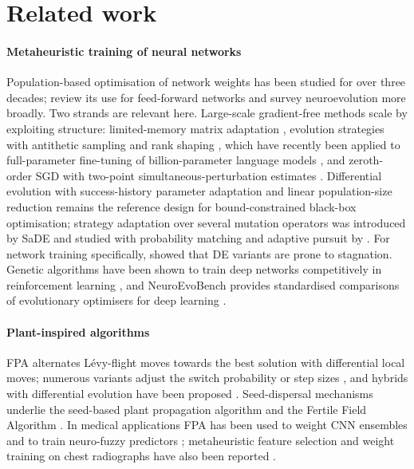 \documentclass[preprint,12pt]{elsarticle}
\begin{document}
\section{Related work}\label{sec:related}

\paragraph{Metaheuristic training of neural networks} Population-based optimisation of network weights has been studied for over three decades; \citet{ojha2017metaheuristic} review its use for feed-forward networks and \citet{stanley2019neuroevolution} survey neuroevolution more broadly. Two strands are relevant here. Large-scale gradient-free methods scale by exploiting structure: limited-memory matrix adaptation \citep{loshchilov2019lmmaes}, evolution strategies with antithetic sampling and rank shaping \citep{salimans2017es}, which have recently been applied to full-parameter fine-tuning of billion-parameter language models \citep{qiu2025esllm}, and zeroth-order SGD with two-point simultaneous-perturbation estimates \citep{spall1992spsa,malladi2023mezo}. Differential evolution \citep{storn1997de} with success-history parameter adaptation \citep{zhang2009jade,tanabe2013shade} and linear population-size reduction \citep{tanabe2014lshade} remains the reference design for bound-constrained black-box optimisation; strategy adaptation over several mutation operators was introduced by SaDE \citep{qin2009sade} and studied with probability matching and adaptive pursuit by \citet{gong2011strategy}. For network training specifically, \citet{piotrowski2014stagnation} showed that DE variants are prone to stagnation. Genetic algorithms have been shown to train deep networks competitively in reinforcement learning \citep{such2017deep}, and NeuroEvoBench provides standardised comparisons of evolutionary optimisers for deep learning \citep{lange2023neuroevobench}.

\paragraph{Plant-inspired algorithms} FPA \citep{yang2012fpa} alternates Lévy-flight moves towards the best solution with differential local moves; numerous variants adjust the switch probability or step sizes \citep{abdelbasset2019fpareview}, and hybrids with differential evolution have been proposed \citep{song2024defpa}. Seed-dispersal mechanisms underlie the seed-based plant propagation algorithm \citep{sulaiman2015sbppa} and the Fertile Field Algorithm \citep{mohammadi2020ffa}. In medical applications FPA has been used to weight CNN ensembles \citep{zhou2025fpaensemble} and to train neuro-fuzzy predictors \citep{kaya2024fpaanfis}; metaheuristic feature selection and weight training on chest radiographs have also been reported \citep{elkenawy2021,almutairi2024}.
\end{document}
